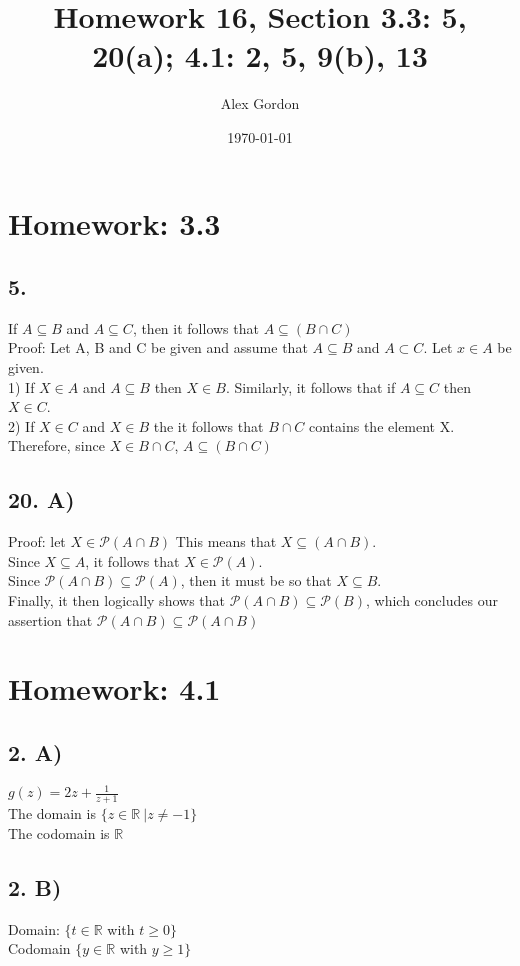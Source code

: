 \documentclass[12]{scrartcl}
\begin{document}
\title{Homework 16, Section 3.3: 5, 20(a); 4.1: 2, 5, 9(b), 13 }
\author{Alex Gordon}
\date{\today}
\maketitle
\section*{Homework: 3.3}
\subsection*{5.}
If $A \subseteq B$ and $A \subseteq C$, then it follows that $A \subseteq (B \cap C)$\\
Proof: Let A, B and C be given and assume that $A \subseteq B $ and  $A \subset C$. Let $x \in A$ be given.\\
1) If $X \in A$ and $A \subseteq B$ then $X \in B$. Similarly, it follows that if $A \subseteq C$ then $X \in C$.\\
2) If $X \in C$ and $X \in B$ the it follows that $B \cap C$ contains the element X. 
\\ Therefore, since $X \in B \cap C$, $A \subseteq (B \cap C)$
\subsection*{20. A)}
Proof: let $X \in \mathcal{P} (A \cap B)$ This means that $X \subseteq (A \cap B)$.\\
Since $X \subseteq A$, it follows that $X \in \mathcal{P}(A)$. \\
Since $\mathcal{P} (A \cap B) \subseteq \mathcal{P}(A)$, then it must be so that $X \subseteq B$. \\
Finally, it then logically shows that  $\mathcal{P} (A \cap B) \subseteq \mathcal{P}(B)$, which concludes our assertion that $\mathcal{P} (A \cap B) \subseteq \mathcal{P}(A \cap B)$
\section*{Homework: 4.1}
\subsection*{2. A)}
$g(z) = 2z + \frac{1}{z + 1}$\\
The domain is $\{z \in \mathds{R} \ | z \neq -1 \}$\\
The codomain is $\mathds{R}$
\subsection*{2. B)}
Domain: $\{\textit{t}\in\mathds{R}$ with $\textit{t}\geq 0 \}$\\
Codomain $\{\textit{y}\in\mathds{R}$ with $\textit{y}\geq 1\}$
\end{document}
